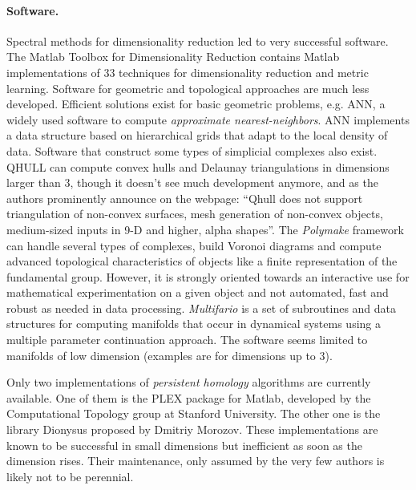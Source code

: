 \paragraph{Software.}%
Spectral methods for dimensionality reduction led to very successful software. 
The Matlab Toolbox for Dimensionality Reduction contains Matlab implementations of 33 techniques for dimensionality reduction and metric learning. Software for geometric and topological approaches are much less developed. Efficient solutions exist for basic geometric problems, e.g.
ANN, a widely used software to compute {\em approximate nearest-neighbors}. ANN implements a data structure based on hierarchical grids that adapt to the local density of data. Software that construct some types of simplicial complexes  also exist. QHULL can compute convex hulls and Delaunay triangulations in dimensions larger than 3, though it doesn't see much development anymore, and as the authors prominently announce on the webpage: ``Qhull does not support triangulation of non-convex surfaces, mesh generation of non-convex objects, medium-sized inputs in 9-D and higher, alpha shapes''. The {\em Polymake} framework can handle several types of complexes, build Voronoi diagrams and compute advanced topological characteristics of objects like a finite representation of the fundamental group. However, it is strongly oriented towards an interactive use for mathematical experimentation on a given object and not automated, fast and robust as needed in data processing.
{\em Multifario} is a set of subroutines and data structures for computing manifolds that occur in dynamical systems using a multiple parameter continuation approach. The software seems limited to manifolds of low dimension (examples are for dimensions up to 3). 

Only two implementations of {\em persistent homology} algorithms are currently available. One of them is the PLEX package for Matlab, developed by the Computational Topology group at Stanford University.  The other one is the library Dionysus proposed by Dmitriy Morozov. These implementations are known to be successful in small dimensions but inefficient as soon as the dimension rises.  Their maintenance, only assumed by the very few authors is likely not to be perennial.

